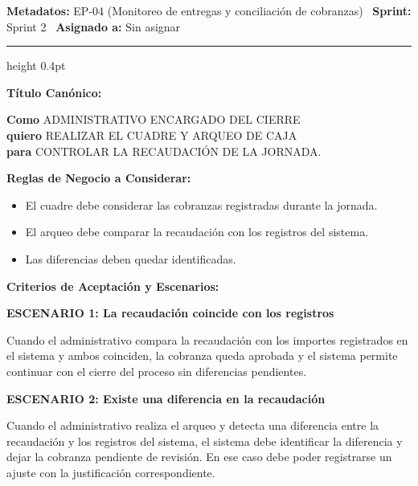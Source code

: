 \documentclass[a4paper,9pt]{article}
\begin{document}
\begin{tcolorbox}[hucard, title={\textbf{HU-21: REALIZAR CUADRE Y ARQUEO DE LA CAJA} \hfill \scriptsize \colorbox{redstatus}{\textbf{\ Rejected\ }} \quad \colorbox{white}{\textcolor{primarydark}{\textbf{\ 3 pts\ }}}}]
\vspace{-1pt}
\noindent\textbf{\footnotesize Metadatos:} EP-04 (Monitoreo de entregas y conciliación de cobranzas) \textbar\ \textbf{Sprint:} Sprint 2 \textbar\ \textbf{Asignado a:} Sin asignar\par\vspace{2pt}
\hrule height 0.4pt\par\vspace{3pt}
\noindent\textbf{\footnotesize Título Canónico:}\par\vspace{1pt}
{\small \textbf{Como} ADMINISTRATIVO ENCARGADO DEL CIERRE \\ \textbf{quiero} REALIZAR EL CUADRE Y ARQUEO DE CAJA \\ \textbf{para} CONTROLAR LA RECAUDACIÓN DE LA JORNADA.}\par\vspace{3pt}
\noindent\textbf{\footnotesize Reglas de Negocio a Considerar:}\par\vspace{1pt}
{\footnotesize
\begin{itemize}[leftmargin=12pt, nosep, itemsep=1.5pt, topsep=1pt]
\item El cuadre debe considerar las cobranzas registradas durante la jornada.
\item El arqueo debe comparar la recaudación con los registros del sistema.
\item Las diferencias deben quedar identificadas.
\end{itemize}
}\par\vspace{3pt}
\noindent\textbf{\footnotesize Criterios de Aceptación y Escenarios:}\par\vspace{2pt}
{\footnotesize
\noindent\textbf{\textcolor{secondarydark}{ESCENARIO 1:  La recaudación coincide con los registros}}\par\vspace{1pt}
Cuando el administrativo compara la recaudación con los importes registrados en el sistema y ambos coinciden, la cobranza queda aprobada y el sistema permite continuar con el cierre del proceso sin diferencias pendientes.\par\vspace{2.5pt}
\noindent\textbf{\textcolor{secondarydark}{ESCENARIO 2:  Existe una diferencia en la recaudación}}\par\vspace{1pt}
Cuando el administrativo realiza el arqueo y detecta una diferencia entre la recaudación y los registros del sistema, el sistema debe identificar la diferencia y dejar la cobranza pendiente de revisión. En ese caso debe poder registrarse un ajuste con la justificación correspondiente.\par\vspace{2.5pt}
}\par
\end{tcolorbox}
\end{document}
